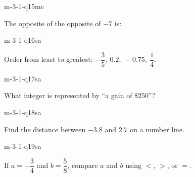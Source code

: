 \begin{practiceQuestion}{m-3-1-q15}{mc}
\begin{questionText}
The opposite of the opposite of $-7$ is:
\end{questionText}
\end{practiceQuestion}


\begin{practiceQuestion}{m-3-1-q16}{sa}
\begin{questionText}
Order from least to greatest: $-\dfrac{3}{5},\ 0.2,\ -0.75,\ \dfrac{1}{4}$.
\end{questionText}
\end{practiceQuestion}

\begin{practiceQuestion}{m-3-1-q17}{sa}
\begin{questionText}
What integer is represented by ``a gain of $\$250$''?
\end{questionText}
\end{practiceQuestion}

\begin{practiceQuestion}{m-3-1-q18}{sa}
\begin{questionText}
Find the distance between $-3.8$ and $2.7$ on a number line.
\end{questionText}
\end{practiceQuestion}

\begin{practiceQuestion}{m-3-1-q19}{sa}
\begin{questionText}
If $a = -\dfrac{3}{4}$ and $b = \dfrac{5}{8}$, compare $a$ and $b$ using $<$, $>$, or $=$.
\end{questionText}
\end{practiceQuestion}

